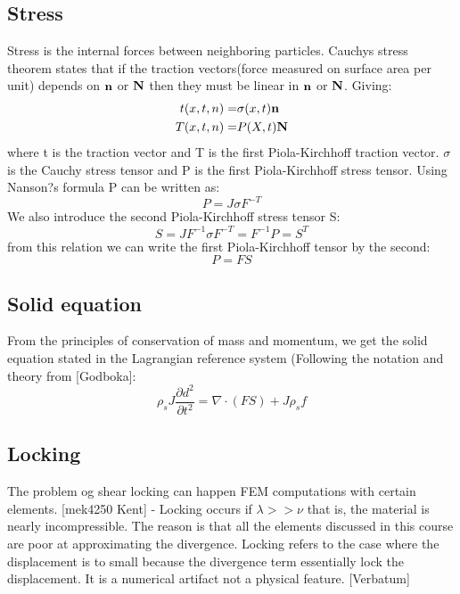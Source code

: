 \subsection*{Stress}
Stress is the internal forces between neighboring particles. 
Cauchys stress theorem states that if the traction vectors(force measured on surface area per unit) depends on $\bold{n}$ or $\bold{N}$ then they must be linear in $\bold{n}$ or $\bold{N}$. Giving: 
\begin{align*}
t(x,t,n) =& \sigma(x,t) \bold{n} \\
T(x,t,n) =& P(X,t) \bold{N} \\
\end{align*}
where t is the traction vector and T is the first Piola-Kirchhoff traction vector. $\sigma$ is the Cauchy stress tensor and P is the first Piola-Kirchhoff stress tensor. Using Nanson?s formula P can be written as:
$$ P = J \sigma F^{-T} $$
We also introduce the second Piola-Kirchhoff stress tensor S:
$$ S = J F^{-1}\sigma F^{-T} = F^{-1} P = S^T $$
from this relation we can write the first Piola-Kirchhoff tensor by the second:
$$ P = FS$$





\subsection*{Solid equation}
From the principles of conservation of mass and momentum, we get the solid equation stated in the Lagrangian reference system (Following the notation and theory from [Godboka]:
\begin{equation}
\rho_s J \frac{\partial d^2}{\partial t^2} = \nabla \cdot ( F S ) + J\rho_s f 
\end{equation}


\subsection*{Locking}
The problem og shear locking can happen FEM computations with certain elements. 
[mek4250 Kent] - Locking occurs if  $ \lambda >> \nu $ that is, the material is nearly incompressible. The reason is that all the elements discussed in this course are poor at approximating the divergence. Locking refers to the case where the displacement is to small because the divergence term essentially lock the displacement. It is a numerical artifact not a physical feature. [Verbatum]






